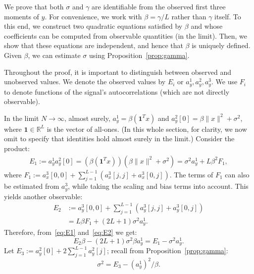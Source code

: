 \documentclass[12pt]{article}
\newcommand{\1}{\mathbf{1}}
\newcommand{\RL}{\mathbb{R}^L}
\newcommand{\one}{\mathbf{1}}
\theoremstyle{plain}
\theoremstyle{definition}
\theoremstyle{remark}
\theoremstyle{plain}
\theoremstyle{remark}
\theoremstyle{plain}
\theoremstyle{plain}
\begin{document}
We prove that both $\sigma$ and $\gamma$ are identifiable from the observed first three moments of $y$. For convenience, we work with $\beta = \gamma / L$ rather than $\gamma$ itself. To this end, we construct two quadratic equations satisfied by $\beta$ and whose coefficients can be computed from observable quantities (in the limit). Then, we show that these equations are independent, and hence that $\beta$ is uniquely defined. Given $\beta$, we can estimate $\sigma$ using Proposition~\ref{prop:gamma}.

Throughout the proof, it is important to distinguish between observed and unobserved values.
We denote the observed values by $E_i$ or $a_y^1,a_y^2,a_y^3$. We use $F_i$ to denote functions of the signal's autocorrelations (which are not directly observable).

In the limit $N \to \infty$, almost surely, $a_y^1 = \beta(\one^Tx)$ and $a_y^2[0] = \beta\|x\|^2+\sigma^2$, where $\one\in\RL$ is the vector of all-ones. (In this whole section, for clarity, we now omit to specify that identities hold almost surely in the limit.) Consider the product:
\begin{equation}\label{eq:E1}
\begin{split}
E_1 := a_y^1a_y^2[0] =  (\beta(\one^Tx))(\beta\|x\|^2+\sigma^2)  = \sigma^2a_y^1 + L\beta^2F_1,
\end{split}
\end{equation}
where $F_1 := a_x^3[0,0] + \sum_{j=1}^{L-1}(a_x^3[j,j] + a_x^3[0,j])$. 
The terms of $F_1$ can also be estimated from $a_y^3$, while taking the scaling and bias terms into account. This yields another observable:
\begin{align} 
E_2 & := a_y^3[0,0] + \sum_{j=1}^{L-1}(a_y^3[j,j] + a_y^3[0,j]) \nonumber\\
& = L\beta F_1 + (2L+1)\sigma^2a_y^1. \label{eq:E2}
\end{align}
Therefore, from~\eqref{eq:E1} and~\eqref{eq:E2} we get:
\begin{equation} \label{eq:E12}
E_2\beta -(2L+1)\sigma^2\beta a_y^1 = E_1-\sigma^2a_y^1.
\end{equation}
Let $E_3:=a_y^2[0] + 2\sum_{j = 1}^{L-1}a_y^2[j]$; recall from Proposition~\ref{prop:gamma}:
\begin{equation} \label{eq:sigma2}
\sigma^2 = E_3 - (a^1_y)^2/\beta. 
\end{equation} 
\end{document}
